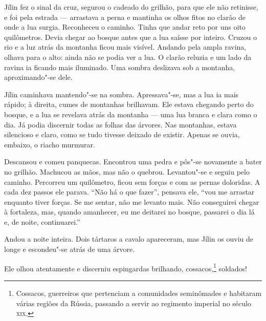 Jílin fez o sinal da cruz, segurou o cadeado do grilhão, para que ele
não retinisse, e foi pela estrada --- arrastava a perna e mantinha os
olhos fitos no clarão de onde a lua surgia. Reconheceu o caminho. Tinha
que andar reto por uns oito quilômetros. Devia chegar ao bosque antes
que a lua saísse por inteiro. Cruzou o rio e a luz atrás da montanha
ficou mais visível. Andando pela ampla ravina, olhava para o alto: ainda
não se podia ver a lua. O clarão reluzia e um lado da ravina ia ficando
mais iluminado. Uma sombra deslizava sob a montanha, aproximando"-se
dele.

Jílin caminhava mantendo"-se na sombra. Apressava"-se, mas a lua ia mais
rápido; à direita, cumes de montanhas brilhavam. Ele estava chegando
perto do bosque, e a lua se revelava atrás da montanha --- uma lua
branca e clara como o dia. Já podia discernir todas as folhas das
árvores. Nas montanhas, estava silencioso e claro, como se tudo tivesse
deixado de existir. Apenas se ouvia, embaixo, o riacho murmurar.


Descansou e comeu panquecas. Encontrou uma pedra e pôs"-se novamente a
bater no grilhão. Machucou as mãos, mas não o quebrou. Levantou"-se e
seguiu pelo caminho. Percorreu um quilômetro, ficou sem forças e com as
pernas doloridas. A cada dez passos ele parava. ``Não há o que fazer'',
pensava ele, ``vou me arrastar enquanto tiver forças. Se me sentar, não
me levanto mais. Não conseguirei chegar à fortaleza, mas, quando
amanhecer, eu me deitarei no bosque, passarei o dia lá e, de noite,
continuarei.''

Andou a noite inteira. Dois tártaros a cavalo apareceram, mas Jílin os
ouviu de longe e escondeu"-se atrás de uma árvore.


Ele olhou atentamente e discerniu espingardas brilhando,
cossacos,\footnote{Cossacos, guerreiros que pertenciam a comunidades
  seminômades e habitaram várias regiões da Rússia, passando a servir ao
  regimento imperial no século \textsc{xix}.} soldados!

